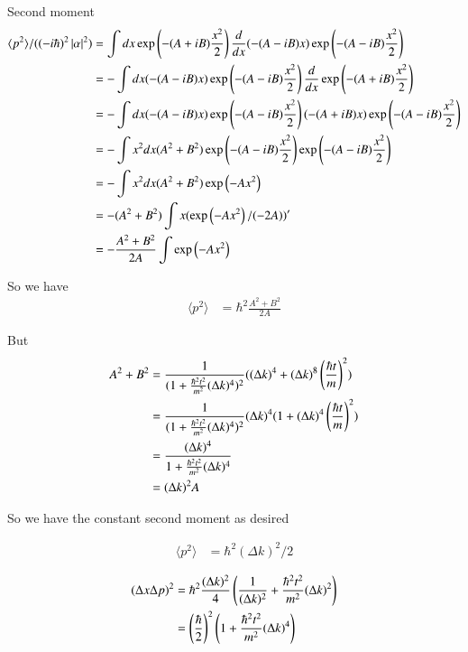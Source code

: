 \documentclass{article}
\newcommand{\expectation}[1]{\langle{#1}\rangle}
\begin{document}
Second moment
\begin{align*}
\expectation{p^2}/((-i\hbar)^2\Abs{\alpha}^2) 
&= \int dx
\exp\left( -(A + iB) \frac{x^2}{2} \right) 
\frac{d}{dx}
(-(A -iB)x) \exp\left( -(A - iB) \frac{x^2}{2} \right)  \\
&= -\int dx
(-(A -iB)x) \exp\left( -(A - iB) \frac{x^2}{2} \right)  
\frac{d}{dx}
\exp\left( -(A + iB) \frac{x^2}{2} \right) 
\\
&= -\int dx
(-(A -iB)x) \exp\left( -(A - iB) \frac{x^2}{2} \right) 
(-(A +iB)x) \exp\left( -(A - iB) \frac{x^2}{2} \right)  \\
&= -\int x^2 dx
(A^2 + B^2) \exp\left( -(A - iB) \frac{x^2}{2} \right) 
\exp\left( -(A - iB) \frac{x^2}{2} \right)  \\
&= -\int x^2 dx (A^2 + B^2) \exp\left( -A x^2 \right) \\
&= - (A^2 + B^2) \int x (\exp\left( -A x^2 \right)/(-2A))' \\
&= -\frac{A^2 + B^2}{2A} \int \exp\left( -A x^2 \right) \\
\end{align*}

So we have
\begin{align*}
\expectation{p^2} &= \hbar^2 \frac{A^2 + B^2}{2A} 
\end{align*}

But 
\begin{align*}
A^2 + B^2 
&= 
\frac{1}{(1 + \frac{\hbar^2 t^2}{m^2}(\Delta k)^4)^2} ((\Delta k)^4 + (\Delta k)^8 \left(\frac{\hbar t}{m}\right)^2 ) \\
&= 
\frac{1}{(1 + \frac{\hbar^2 t^2}{m^2}(\Delta k)^4)^2} (\Delta k)^4(1 + (\Delta k)^4 \left(\frac{\hbar t}{m}\right)^2 ) \\
&= 
\frac{(\Delta k)^4}{1 + \frac{\hbar^2 t^2}{m^2}(\Delta k)^4} \\
&= (\Delta k)^2 A
\end{align*}

So we have the constant second moment as desired

\begin{align*}
\expectation{p^2} &= \hbar^2 (\Delta k)^2/2
\end{align*}

\begin{align*}
(\Delta x \Delta p)^2
&= \hbar^2 \frac{(\Delta k)^2}{4} \left( \frac{1}{(\Delta k)^2} + \frac{\hbar^2 t^2}{m^2}(\Delta k)^2 \right) \\
&= \left(\frac{\hbar}{2}\right)^2 \left( 1 + \frac{\hbar^2 t^2}{m^2}(\Delta k)^4 \right) \\
\end{align*}
\end{document}
